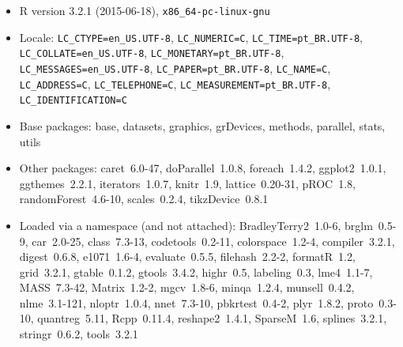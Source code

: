 \documentclass[a4paper,titlepage]{ppgi}\usepackage[]{graphicx}\usepackage[]{color}
\begin{document}
\begin{itemize}\raggedright
  \item R version 3.2.1 (2015-06-18), \verb|x86_64-pc-linux-gnu|
  \item Locale: \verb|LC_CTYPE=en_US.UTF-8|, \verb|LC_NUMERIC=C|, \verb|LC_TIME=pt_BR.UTF-8|, \verb|LC_COLLATE=en_US.UTF-8|, \verb|LC_MONETARY=pt_BR.UTF-8|, \verb|LC_MESSAGES=en_US.UTF-8|, \verb|LC_PAPER=pt_BR.UTF-8|, \verb|LC_NAME=C|, \verb|LC_ADDRESS=C|, \verb|LC_TELEPHONE=C|, \verb|LC_MEASUREMENT=pt_BR.UTF-8|, \verb|LC_IDENTIFICATION=C|
  \item Base packages: base, datasets, graphics, grDevices,
    methods, parallel, stats, utils
  \item Other packages: caret~6.0-47, doParallel~1.0.8,
    foreach~1.4.2, ggplot2~1.0.1, ggthemes~2.2.1, iterators~1.0.7,
    knitr~1.9, lattice~0.20-31, pROC~1.8, randomForest~4.6-10,
    scales~0.2.4, tikzDevice~0.8.1
  \item Loaded via a namespace (and not attached):
    BradleyTerry2~1.0-6, brglm~0.5-9, car~2.0-25, class~7.3-13,
    codetools~0.2-11, colorspace~1.2-4, compiler~3.2.1,
    digest~0.6.8, e1071~1.6-4, evaluate~0.5.5, filehash~2.2-2,
    formatR~1.2, grid~3.2.1, gtable~0.1.2, gtools~3.4.2,
    highr~0.5, labeling~0.3, lme4~1.1-7, MASS~7.3-42,
    Matrix~1.2-2, mgcv~1.8-6, minqa~1.2.4, munsell~0.4.2,
    nlme~3.1-121, nloptr~1.0.4, nnet~7.3-10, pbkrtest~0.4-2,
    plyr~1.8.2, proto~0.3-10, quantreg~5.11, Rcpp~0.11.4,
    reshape2~1.4.1, SparseM~1.6, splines~3.2.1, stringr~0.6.2,
    tools~3.2.1
\end{itemize}


%
%
%
\end{document}
